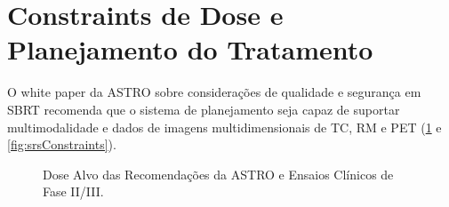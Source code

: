 \documentclass[11pt,a4paper]{article}
\begin{document}
\section{Constraints de Dose e Planejamento do Tratamento}

	O white paper da ASTRO sobre considerações de qualidade e segurança em SBRT recomenda que o sistema de planejamento seja capaz de suportar multimodalidade e dados de imagens multidimensionais de TC, RM e PET (\ref{fig:srsDoses} e \ref{fig:srsConstraints}). 

	\begin{figure}[!hbt]
		\centering
		\caption{Dose Alvo das Recomendações da ASTRO e Ensaios Clínicos de Fase II/III.}
		\label{fig:srsDoses}
	\end{figure}
\end{document}
